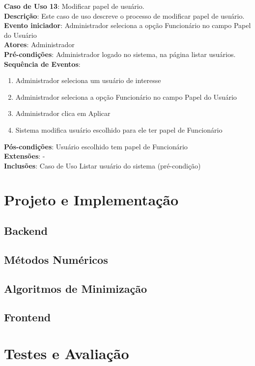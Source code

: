 \documentclass[]{politex}
\begin{document}
\noindent \textbf{Caso de Uso 13}: Modificar papel de usuário. \\
\textbf{Descrição}: Este caso de uso descreve o processo de modificar papel de
usuário. \\
\textbf{Evento iniciador}: Administrador seleciona a opção Funcionário no campo
Papel do Usuário \\
\textbf{Atores}: Administrador \\
\textbf{Pré-condições}: Administrador logado no sistema, na página listar
usuários. \\
\textbf{Sequência de Eventos}:
\begin{enumerate}
\item Administrador seleciona um usuário de interesse
\item Administrador seleciona a opção Funcionário no campo Papel do Usuário
\item Administrador clica em Aplicar
\item Sistema modifica usuário escolhido para ele ter papel de Funcionário
\end{enumerate}
\textbf{Pós-condições}: Usuário escolhido tem papel de Funcionário \\
\textbf{Extensões}: - \\
\textbf{Inclusões}: Caso de Uso Listar usuário do sistema (pré-condição) \\


\chapter{Projeto e Implementação}

\section{Backend}
\section{Métodos Numéricos}

\section{Algoritmos de Minimização}
\section{Frontend}

\chapter{Testes e Avaliação}
\end{document}

